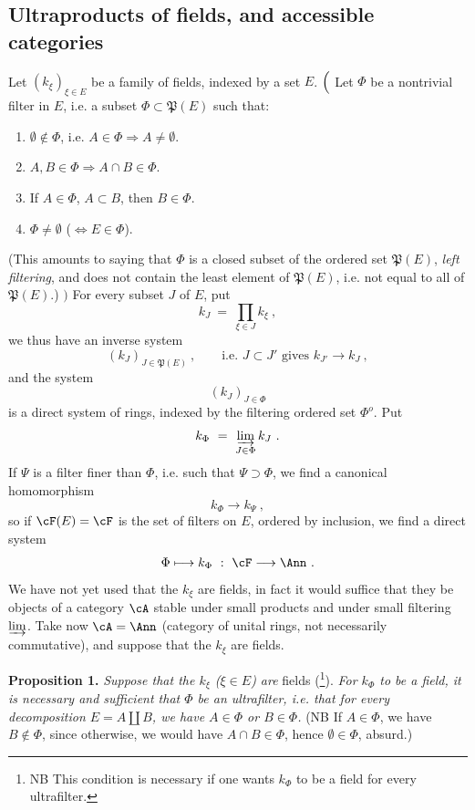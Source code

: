 \subsection*{Ultraproducts of fields, and accessible categories}

\noindent Let $(k_\xi)_{\xi\in E}$ be a family of fields, indexed by a set $E$. $\Bigl($ Let $\Phi$ be a nontrivial filter in $E$, i.e. a subset $\Phi\subset\mathfrak{P}(E)$ such that:
\begin{enumerate}
\item[a)] $\emptyset\notin\Phi$, i.e. $A\in\Phi\Longrightarrow A\neq\emptyset$.
\item[b)] $A,B\in\Phi\Longrightarrow A\cap B\in\Phi$.
\item[c)] If $A\in\Phi$, $A\subset B$, then $B\in\Phi$.
\item[d)] $\Phi\neq\emptyset$ ($\iff E\in\Phi$).
\end{enumerate}
(This amounts to saying that $\Phi$ is a closed subset of the ordered set $\mathfrak{P}(E)$, \textit{left filtering}, and does not contain the least element of $\mathfrak{P}(E)$, i.e. not equal to all of $\mathfrak{P}(E)$.) $\Bigr)$ For every subset $J$ of $E$, put
\[
k_J \ = \ \prod_{\xi\in J} k_\xi \ ,
\]
we thus have an inverse system
\[
(k_J)_{J\in\mathfrak{P}(E)} \ , \qquad \text{i.e. } J\subset J' \text{ gives } k_{J'}\longrightarrow k_J \ ,
\]
and the system
\[
(k_J)_{J\in\Phi}
\]
is a direct system of rings, indexed by the filtering ordered set $\Phi^o$. Put %
\[
k_\Phi \ = \ \varinjlim_{J\in\Phi} k_J \ .
\]
If $\Psi$ is a filter finer than $\Phi$, i.e.
such that $\Psi\supset\Phi$, we find a canonical homomorphism
\[
k_\Phi \longrightarrow k_\Psi \ ,
\]
so if $\cF(E)=\cF$ is the set of filters on $E$, ordered by inclusion, we find a direct system
\[
\Phi \longmapsto k_\Phi \ : \ \cF \longrightarrow \Ann \ .
\]
We have not yet used that the $k_\xi$ are fields, in fact it would suffice that they be objects of a category $\cA$ stable under small products and under small filtering $\varinjlim$. Take now $\cA=\Ann$ (category of unital rings, not necessarily commutative), and suppose that the $k_\xi$ are fields. %


\noindent\textbf{Proposition 1.} \textit{Suppose that the $k_\xi$ ($\xi\in E$) are} fields (\footnote[203]{NB This condition is necessary if one wants $k_\Phi$ to be a field for every ultrafilter.}). \textit{For $k_\Phi$ to be a field, it is necessary and sufficient that $\Phi$ be an ultrafilter, i.e. that for every decomposition $E=A\amalg B$, we have $A\in\Phi$ or $B\in\Phi$.} (NB If $A\in\Phi$, we have $B\notin\Phi$, since otherwise, we would have $A\cap B\in\Phi$, hence $\emptyset\in\Phi$, absurd.)

